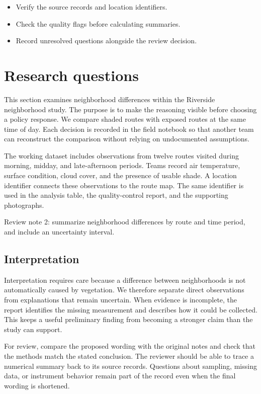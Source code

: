 \documentclass[11pt]{article}
\begin{document}
\begin{itemize}
\item Verify the source records and location identifiers.
\item Check the quality flags before calculating summaries.
\item Record unresolved questions alongside the review decision.
\end{itemize}

\section{Research questions}
This section examines neighborhood differences within the Riverside neighborhood study. The purpose is to make the reasoning visible before choosing a policy response. We compare shaded routes with exposed routes at the same time of day. Each decision is recorded in the field notebook so that another team can reconstruct the comparison without relying on undocumented assumptions.

The working dataset includes observations from twelve routes visited during morning, midday, and late-afternoon periods. Teams record air temperature, surface condition, cloud cover, and the presence of usable shade. A location identifier connects these observations to the route map. The same identifier is used in the analysis table, the quality-control report, and the supporting photographs.

Review note 2: summarize neighborhood differences by route and time period, and include an uncertainty interval.

\subsection{Interpretation}
Interpretation requires care because a difference between neighborhoods is not automatically caused by vegetation. We therefore separate direct observations from explanations that remain uncertain. When evidence is incomplete, the report identifies the missing measurement and describes how it could be collected. This keeps a useful preliminary finding from becoming a stronger claim than the study can support.

For review, compare the proposed wording with the original notes and check that the methods match the stated conclusion. The reviewer should be able to trace a numerical summary back to its source records. Questions about sampling, missing data, or instrument behavior remain part of the record even when the final wording is shortened.
\end{document}
